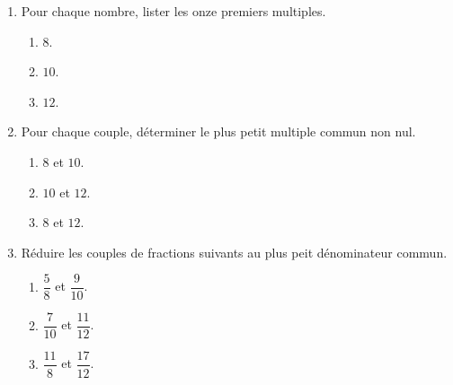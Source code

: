 \begin{exercice*}
    \begin{enumerate}
        \item Pour chaque nombre, lister les onze premiers multiples.
        \begin{multicols}{3}
            \begin{enumerate}
                \item $8$.
                \item $10$.
                \item $12$.
            \end{enumerate}
        \end{multicols}
        \item Pour chaque couple, déterminer le plus petit multiple commun non nul.
        \begin{multicols}{3}
            \begin{enumerate}
                \item $8$ et $10$.
                \item $10$ et $12$.
                \item $8$ et $12$.
            \end{enumerate}           
        \end{multicols}
        \item Réduire les couples de fractions suivants au plus peit dénominateur commun.
        \begin{multicols}{3}
            \begin{enumerate}
                \item $\dfrac{5}{8}$ et $\dfrac{9}{10}$.
                \item $\dfrac{7}{10}$ et $\dfrac{11}{12}$.
                \item $\dfrac{11}{8}$ et $\dfrac{17}{12}$.
            \end{enumerate}
        \end{multicols}
    \end{enumerate}
\end{exercice*}
